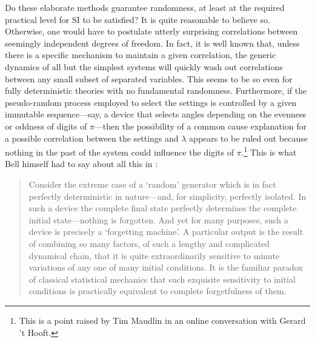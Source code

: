 \documentclass[letterpaper,12pt]{article}
\begin{document}
Do these elaborate methods guarantee randomness, at least at the required practical level for SI to be satisfied? It is quite reasonable to believe so. Otherwise, one would have to postulate utterly surprising correlations between seemingly independent degrees of freedom. In fact, it is well known that, unless there is a specific mechanism to maintain a given correlation, the generic dynamics of all but the simplest systems will quickly wash out correlations between any small subset of separated variables. This seems to be so even for fully deterministic theories with no fundamental randomness. Furthermore, if the pseudo-random process employed to select the settings is controlled by a given immutable sequence---say, a device that selects angles depending on the evenness or oddness of digits of $ \pi $---then the possibility of a common cause explanation for a possible correlation between the settings and $\lambda$ appears to be ruled out because nothing in the past of the system could influence the digits of $ \pi $.\footnote{This is a point raised by Tim Maudlin in an online conversation with Gerard 't Hooft.} This is what Bell himself had to say about all this in \cite{Bell1977}:
\begin{quotation}
Consider the extreme case of a `random' generator which is in fact perfectly deterministic in nature---and, for simplicity, perfectly isolated. In such a device the complete final state perfectly determines the complete initial state---nothing is forgotten. And yet for many purposes, such a device is precisely a `forgetting machine'. A particular output is the result of combining so many factors, of such a lengthy and complicated dynamical chain, that it is quite extraordinarily sensitive to minute variations of any one of many initial conditions. It is the familiar paradox of classical statistical mechanics that such exquisite sensitivity to initial conditions is practically equivalent to complete forgetfulness of them.
\end{quotation}
\end{document}
